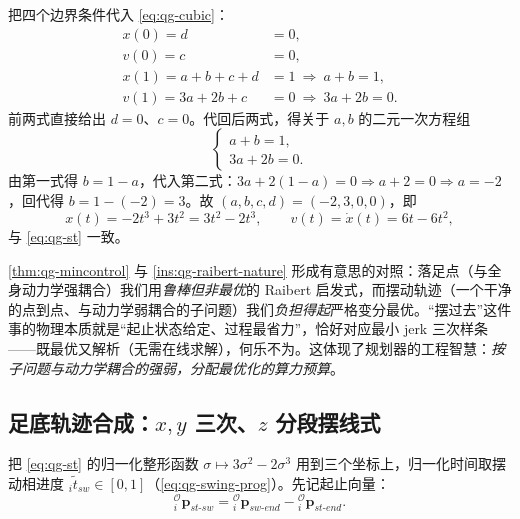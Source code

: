\begin{derivation}\label{deriv:qg-coeff}
把四个边界条件代入 \cref{eq:qg-cubic}：
\[
  \begin{aligned}
  x(0)=d&=0,\\
  v(0)=c&=0,\\
  x(1)=a+b+c+d&=1\ \Rightarrow\ a+b=1,\\
  v(1)=3a+2b+c&=0\ \Rightarrow\ 3a+2b=0.
  \end{aligned}
\]
前两式直接给出 $d=0$、$c=0$。代回后两式，得关于 $a,b$ 的二元一次方程组
\[
  \begin{cases}
  a+b=1,\\
  3a+2b=0.
  \end{cases}
\]
由第一式得 $b=1-a$，代入第二式：$3a+2(1-a)=0\Rightarrow a+2=0\Rightarrow a=-2$，回代得 $b=1-(-2)=3$。故 $(a,b,c,d)=(-2,3,0,0)$，即
\[
  x(t)=-2t^3+3t^2=3t^2-2t^3,\qquad v(t)=\dot x(t)=6t-6t^2,
\]
与 \cref{eq:qg-st} 一致。
\end{derivation}

\begin{insight}[把“最优”用在负担得起的子问题上]\label{ins:qg-optimal-subproblem}
\cref{thm:qg-mincontrol} 与 \cref{ins:qg-raibert-nature} 形成有意思的对照：落足点（与全身动力学强耦合）我们用\emph{鲁棒但非最优}的 Raibert 启发式，而摆动轨迹（一个干净的点到点、与动力学弱耦合的子问题）我们\emph{负担得起}严格变分最优。“摆过去”这件事的物理本质就是“起止状态给定、过程最省力”，恰好对应最小 jerk 三次样条——既最优又解析（无需在线求解），何乐不为。这体现了规划器的工程智慧：\emph{按子问题与动力学耦合的强弱，分配最优化的算力预算}。
\end{insight}

\subsection{足底轨迹合成：\texorpdfstring{$x,y$}{x,y} 三次、\texorpdfstring{$z$}{z} 分段摆线式}
\label{subsec:qg-swing-synth}

把 \cref{eq:qg-st} 的归一化整形函数 $\sigma\mapsto3\sigma^2-2\sigma^3$ 用到三个坐标上，归一化时间取摆动相进度 ${}_i\tilde t_{sw}\in[0,1]$（\cref{eq:qg-swing-prog}）。先记起止向量\cite{yu2021quadruped}：
\begin{equation}
  {}_i^{\mathcal{O}}\boldsymbol{p}_{st\text{-}sw}={}_i^{\mathcal{O}}\boldsymbol{p}_{sw\text{-}end}-{}_i^{\mathcal{O}}\boldsymbol{p}_{st\text{-}end}.
  \label{eq:qg-stsw}
\end{equation}

